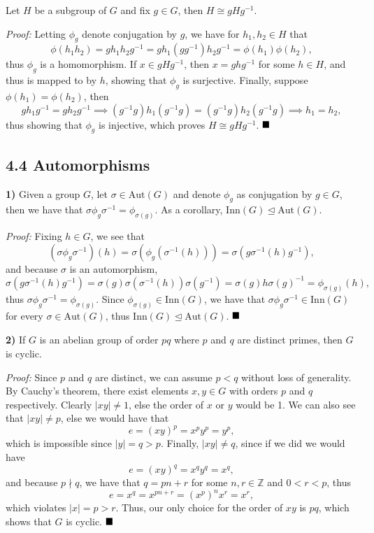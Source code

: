 \documentclass[12pt]{article}
\newcommand{\Z}{\mathbb{Z}}
\renewcommand{\t}[1]{\text{#1}}
\newcommand{\vertb}[1]{\left\vert#1\right\vert}
\newcommand{\normsub}{\trianglelefteq}
\newcommand{\aut}{\t{Aut}}
\newcommand{\inn}{\t{Inn}}
\newcommand{\proof}{\textit{Proof: }}
\newcommand{\done}{\ensuremath{\strut\hfill\blacksquare}}
\begin{document}
\pagestyle{fancy}

\setlength{\parindent}{0in}
\setlength{\parskip}{0.25in}

Let \( H \) be a subgroup of \( G \) and fix \( g \in G \), then
\( H \cong gHg^{-1} \).

\proof
Letting \( \phi_g \) denote conjugation by \( g \), we have for
\( h_1, h_2 \in H \) that
\[
	\phi(h_1h_2)
	= gh_1h_2g^{-1}
	= gh_1(gg^{-1})h_2g^{-1}
	= \phi(h_1)\phi(h_2),
\]
thus \( \phi_g \) is a homomorphism.
If \( x \in gHg^{-1} \), then \( x = ghg^{-1} \) for some \( h \in H \), and
thus is mapped to by \( h \), showing that \( \phi_g \) is surjective.
Finally, suppose \( \phi(h_1) = \phi(h_2) \), then
\[
	gh_1g^{-1}
	= gh_2g^{-1}
	\implies 
	(g^{-1}g)h_1(g^{-1}g)
	= (g^{-1}g)h_2(g^{-1}g)
	\implies
	h_1
	= h_2,
\]
thus showing that \( \phi_g \) is injective, which proves
\( H \cong gHg^{-1} \).
\done

\subsection*{4.4 Automorphisms}

\textbf{1)}
Given a group \( G \), let \( \sigma \in \aut(G) \) and denote \( \phi_g \) as
conjugation by \( g \in G \), then we have that
\( \sigma\phi_g\sigma^{-1} = \phi_{\sigma(g)} \).
As a corollary, \( \inn(G) \normsub \aut(G) \).

\proof
Fixing \( h \in G \), we see that
\[
	(\sigma\phi_g\sigma^{-1})(h)
	= \sigma(\phi_g(\sigma^{-1}(h)))
	= \sigma(g\sigma^{-1}(h)g^{-1}),
\]
and because \( \sigma \) is an automorphism,
\[
	\sigma(g\sigma^{-1}(h)g^{-1})
	= \sigma(g)\sigma(\sigma^{-1}(h))\sigma(g^{-1})
	= \sigma(g)h\sigma(g)^{-1}
	= \phi_{\sigma(g)}(h),
\]
thus \( \sigma\phi_g\sigma^{-1} = \phi_{\sigma(g)} \).
Since \( \phi_{\sigma(g)} \in \inn(G) \), we have that
\( \sigma\phi_g\sigma^{-1} \in \inn(G) \) for every \( \sigma \in \aut(G) \),
thus \( \inn(G) \normsub \aut(G) \).
\done

\textbf{2)}
If \( G \) is an abelian group of order \( pq \) where \( p \) and \( q \) are
distinct primes, then \( G \) is cyclic.

\proof
Since \( p \) and \( q \) are distinct, we can assume \( p < q \) without loss
of generality.
By Cauchy's theorem, there exist elements \( x, y \in G \) with orders \( p \)
and \( q \) respectively.
Clearly \( \vertb{xy} \ne 1 \), else the order of \( x \) or \( y \) would be
1.
We can also see that \( \vertb{xy} \ne p \), else we would have that
\[
	e = (xy)^p = x^py^p = y^p,
\]
which is impossible since \( \vertb{y} = q > p \).
Finally, \( \vertb{xy} \ne q \), since if we did we would have
\[
	e = (xy)^q = x^qy^q = x^q,
\]
and because \( p \nmid q \), we have that \( q = pn + r \) for some
\( n, r \in \Z \) and \( 0 < r < p \), thus
\[
	e = x^q = x^{pn + r} = (x^p)^nx^r = x^r,
\]
which violates \( \vertb{x} = p > r \).
Thus, our only choice for the order of \( xy \) is \( pq \), which shows that
\( G \) is cyclic.
\done
\end{document}
